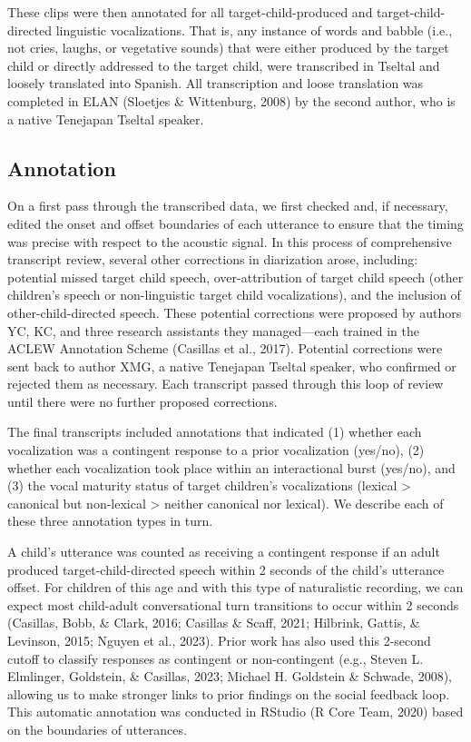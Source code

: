\documentclass[
  man]{apa6}
\begin{document}
These clips were then annotated for all target-child-produced and target-child-directed linguistic vocalizations. That is, any instance of words and babble (i.e., not cries, laughs, or vegetative sounds) that were either produced by the target child or directly addressed to the target child, were transcribed in Tseltal and loosely translated into Spanish. All transcription and loose translation was completed in ELAN (Sloetjes \& Wittenburg, 2008) by the second author, who is a native Tenejapan Tseltal speaker.

\hypertarget{annotation}{%
\subsection{Annotation}\label{annotation}}

On a first pass through the transcribed data, we first checked and, if necessary, edited the onset and offset boundaries of each utterance to ensure that the timing was precise with respect to the acoustic signal. In this process of comprehensive transcript review, several other corrections in diarization arose, including: potential missed target child speech, over-attribution of target child speech (other children's speech or non-linguistic target child vocalizations), and the inclusion of other-child-directed speech. These potential corrections were proposed by authors YC, KC, and three research assistants they managed---each trained in the ACLEW Annotation Scheme (Casillas et al., 2017). Potential corrections were sent back to author XMG, a native Tenejapan Tseltal speaker, who confirmed or rejected them as necessary. Each transcript passed through this loop of review until there were no further proposed corrections.

The final transcripts included annotations that indicated (1) whether each vocalization was a contingent response to a prior vocalization (yes/no), (2) whether each vocalization took place within an interactional burst (yes/no), and (3) the vocal maturity status of target children's vocalizations (lexical \textgreater{} canonical but non-lexical \textgreater{} neither canonical nor lexical). We describe each of these three annotation types in turn.

A child's utterance was counted as receiving a contingent response if an adult produced target-child-directed speech within 2 seconds of the child's utterance offset. For children of this age and with this type of naturalistic recording, we can expect most child-adult conversational turn transitions to occur within 2 seconds (Casillas, Bobb, \& Clark, 2016; Casillas \& Scaff, 2021; Hilbrink, Gattis, \& Levinson, 2015; Nguyen et al., 2023). Prior work has also used this 2-second cutoff to classify responses as contingent or non-contingent (e.g., Steven L. Elmlinger, Goldstein, \& Casillas, 2023; Michael H. Goldstein \& Schwade, 2008), allowing us to make stronger links to prior findings on the social feedback loop. This automatic annotation was conducted in RStudio (R Core Team, 2020) based on the boundaries of utterances.
\end{document}

